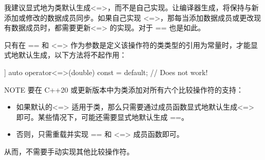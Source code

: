 我建议显式地为类默认生成<=>，而不是自己实现。让编译器生成，将保持与新添加或修改的数据成员同步。如果自己实现 <=>，那每当添加数据成员或更改现有数据成员时，都需要更新<=> 的实现。对于 == 也是如此。

只有在 == 和 <=> 作为参数是定义该操作符的类类型的引用为常量时，才能显式地默认生成，以下方法将不起作用：

\begin{cpp}
[[nodiscard]] auto operator<=>(double) const = default; // Does not work!
\end{cpp}

\begin{myNotic}{NOTE}
要在 C++20 或更新版本中为类添加对所有六个比较操作符的支持：

\begin{itemize}
\item
如果默认的<=> 适用于类，那么只需要通过成员函数显式地默认生成<=> 即可。某些情况下，可能还需要显式地默认生成 ==。

\item
否则，只需重载并实现 == 和 <=> 成员函数即可。
\end{itemize}

从而，不需要手动实现其他比较操作符。
\end{myNotic}
